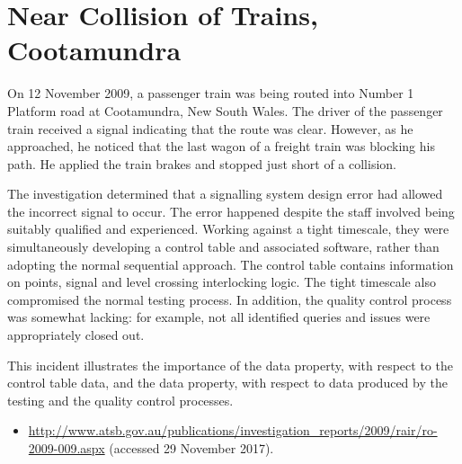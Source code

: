 \section{Near Collision of Trains, Cootamundra} \label{bkm:incacc:cootamundra}
On 12 November 2009, a passenger train was being routed into Number 1 Platform road at Cootamundra, New South Wales. The driver of the passenger train received a signal indicating that the route was clear. However, as he approached, he noticed that the last wagon of a freight train was blocking his path. He applied the train brakes and stopped just short of a collision.

The investigation determined that a signalling system design error had allowed the incorrect signal to occur. The error happened despite the staff involved being suitably qualified and experienced. Working against a tight timescale, they were simultaneously developing a control table and associated software, rather than adopting the normal sequential approach. The control table contains \gls{information} on points, signal and level crossing interlocking logic. The tight timescale also compromised the normal testing process. In addition, the quality control process was somewhat lacking: for example, not all identified queries and issues were appropriately closed out.

This incident illustrates the importance of the  \gls{data property}, with respect to the control table data, and the  \gls{data property}, with respect to data produced by the testing and the quality control processes.

\begin{samepage}
\begin{itemize}
	\item \raggedright{\href{http://www.atsb.gov.au/publications/investigation_reports/2009/rair/ro-2009-009.aspx}{http://www.atsb.gov.au/publications/investigation\_reports/2009/rair/ro-2009-009.aspx} (accessed 29 November 2017).}
\end{itemize}
\end{samepage}


